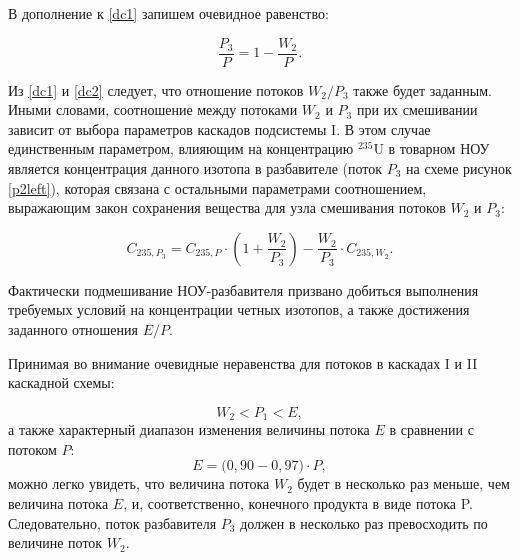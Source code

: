 В дополнение к \ref{dc1} запишем очевидное равенство:

\begin{equation}
    \label{dc2}
    \frac{P_{3}}{P} = 1 - \frac{W_{2}}{P}.
\end{equation}

Из \ref{dc1} и \ref{dc2} следует, что отношение потоков ${W_2}{/}{P_3}$ также будет заданным. Иными словами, соотношение между потоками $W_2$ и $P_3$ при их смешивании зависит от выбора параметров каскадов подсистемы I. В этом случае единственным параметром, влияющим на концентрацию $^{235}$U в товарном НОУ является концентрация данного изотопа в разбавителе (поток $P_3$ на схеме рисунок \ref{p2left}), которая связана с остальными параметрами соотношением, выражающим закон сохранения вещества для узла смешивания потоков $W_2$ и $P_3$: 

\begin{equation}
    \label{dc3}
    C_{235,P_{3}}=C_{235,P} \cdot ({1 + \frac{W_{2}}{P_{3}}}) - \frac{W_{2}}{P_{3}}\cdot C_{235,W_{2}}.
\end{equation}

Фактически подмешивание НОУ-разбавителя призвано добиться выполнения требуемых условий на концентрации четных изотопов, а также достижения заданного отношения $E{/}P$.

Принимая во внимание очевидные неравенства для потоков в каскадах I и II каскадной схемы:

\begin{equation}
    \label{dc3a}
    W_{2} < P_{1} <  E,
\end{equation}
а также характерный диапазон изменения величины потока $E$ в сравнении с потоком $P$:
\begin{equation}
    \label{dc3b}
    E = {(}0,90-0,97{)} \cdot P,
\end{equation}
можно легко увидеть, что величина потока $W_{2}$ будет в несколько раз меньше, чем величина потока $E$, и, соответственно, конечного продукта в виде потока P. Следовательно, поток разбавителя $P_{3}$ должен в несколько раз превосходить по величине поток $W_{2}$. 

